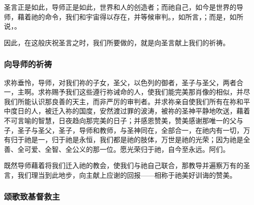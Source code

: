 \par

\par

圣言正是如此，导师正是如此，世界和人的创造者；而祂自己，如今是世界的导师，藉着祂的命令，我们和宇宙得以存在，并等候审判。，如所言，；而是，如所说，。\par

因此，在这般庆祝圣言之时，我们所要做的，就是向圣言献上我们的祈祷。\par


\subsubsection{向导师的祈祷}

求祢垂怜，导师，对我们祢的子女，圣父，以色列的御者，圣子与圣父，两者合一，主啊。求祢赐予我们这些遵行祢诫命的人，使我们能完美那肖像的相似，并尽我们所能认识那良善的天主，而非严厉的审判者。并求祢亲自使我们所有在祢和平中度日的人，被迁入祢的国度，安然渡过罪的波涛，被祢的圣神平静地吹送，藉着不可言喻的智慧，日夜趋向那完美的日子；并感恩赞美，赞美感谢那唯一的父与子，圣子与圣父，圣子，导师和教师，与圣神同在，全部合一，在祂内有一切，万有归于祂是一，归于祂是永恒，我们都是祂的肢体，万世是祂的光荣；因为祂是全善、全可爱、全智、全公义的那一位。愿光荣归于祂，自今至永远。阿们。\par

既然导师藉着将我们迁入祂的教会，使我们与祂自己联合，那教导并遍察万有的圣言，我们理当到此地步，向主献上应谢的回报——相称于祂美好训诲的赞美。\par


\subsubsection{颂歌致基督救主}

